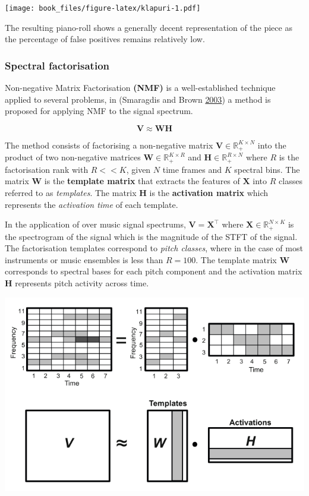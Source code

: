 \documentclass[american,]{article}
\begin{document}
\texttt{[image: book\_files/figure-latex/klapuri-1.pdf]}

The resulting piano-roll shows a generally decent
representation of the piece as the percentage
of false positives remains relatively low.

\hypertarget{spectral-factorisation}{%
\subsubsection{Spectral factorisation}\label{spectral-factorisation}}

Non-negative Matrix Factorisation \textbf{(NMF)} is a well-established
technique applied to several problems, in (Smaragdis and Brown \protect\hyperlink{ref-NNMF}{2003}) a method
is proposed for applying NMF to the signal spectrum.

\[\boldsymbol{V}\approx\boldsymbol{W}\boldsymbol{H}\]

The method consists of factorising a non-negative matrix
\(\boldsymbol{V}\in\mathbb{R}_+^{K\times N}\) into the product of two non-negative matrices
\(\boldsymbol{W}\in\mathbb{R}_+^{K\times R}\) and \(\boldsymbol{H}\in\mathbb{R}_+^{R\times N}\) where \(R\)
is the factorisation rank with \(R<<K\), given \(N\) time frames
and \(K\) spectral bins.
The matrix \(\boldsymbol{W}\) is the \textbf{template matrix} that extracts the features
of \(\boldsymbol{X}\) into \(R\) classes referred to as \emph{templates}.
The matrix \(\boldsymbol{H}\) is the \textbf{activation matrix} which represents
the \emph{activation time} of each template.

In the application of over music signal spectrums, \(\boldsymbol{V}={\boldsymbol{X}}^{\top}\)
where \(\boldsymbol{X}\in\mathbb{R}_+^{N\times K}\) is the spectrogram of the signal
which is the magnitude of the STFT of the signal.
The factorisation templates correspond to \emph{pitch classes},
where in the case of most instruments or music ensembles is less than \(R=100\).
The template matrix \(\boldsymbol{W}\) corresponds to spectral bases for each pitch
component and the activation matrix \(\boldsymbol{H}\) represents pitch activity
across time.

\includegraphics{img/nmf.png}
\end{document}
